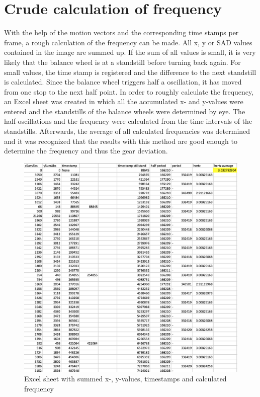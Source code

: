 \documentclass[12pt, a4paper]{report}
\begin{document}
    \section{Crude calculation of frequency}
    With the help of the motion vectors and the corresponding time stamps per frame, a rough calculation of the frequency can be made. All x, y or SAD values contained in the image are summed up. If the sum of all values is small, it is very likely that the balance wheel is at a standstill before turning back again. For small values, the time stamp is registered and the difference to the next standstill is calculated. Since the balance wheel triggers half a oscillation, it has moved from one stop to the next half point. 
    In order to roughly calculate the frequency, an Excel sheet was created in which all the accumulated x- and y-values were entered and the standstills of the balance wheels were determined by eye. The half-oscillations and the frequency were calculated from the time intervals of the standstills. Afterwards, the average of all calculated frequencies was determined and it was recognized that the results with this method are good enough to determine the frequency and thus the gear deviation. 
    
    \bigskip
    \noindent
    \begin{figure}
    \centering
    \includegraphics[scale=0.4]{Images/excel_sheet_numbers.png}
    
    \caption{Excel sheet with summed x-, y-values, timestamps and calculated frequency}
    \end{figure}
    
\end{document}
